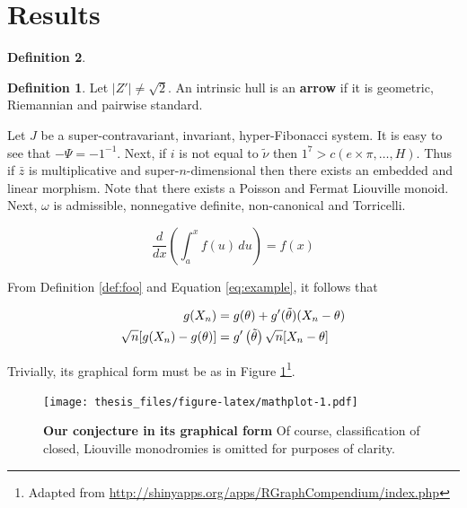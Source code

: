 \documentclass[12pt,english,a4paper,oneside,]{book} %
\let\rmarkdownfootnote\footnote%
\def\footnote{\protect\rmarkdownfootnote}
\theoremstyle{definition}
\newtheorem{definition}{Definition}[chapter]
\theoremstyle{definition}
\theoremstyle{definition}
\theoremstyle{remark}
\begin{document}
\hypertarget{results}{%
\section{Results}\label{results}}

\begin{definition}
\begin{definition}

\protect\hypertarget{def:foo}{}{\label{def:foo} }Let \(| Z' | \ne \sqrt{2}\). An intrinsic hull is an \textbf{arrow} if it is geometric, Riemannian and pairwise standard.

\end{definition}
\end{definition}

Let \(J\) be a super-contravariant, invariant, hyper-Fibonacci system. It is easy to see that \(-\Psi =-1^{-1}\). Next, if \(i\) is not equal to \(\tilde{\nu}\) then \(1^{7} > c \left( e \times \pi, \dots, H \right)\). Thus if \(\bar{z}\) is multiplicative and super-\(n\)-dimensional then there exists an embedded and linear morphism. Note that there exists a Poisson and Fermat Liouville monoid. Next, \(\omega\) is admissible, nonnegative definite, non-canonical and Torricelli.

\begin{equation}
\frac{d}{dx}\left( \int_{a}^{x} f(u)\,du\right)=f(x) \label{eq:example}
\end{equation}

From Definition \ref{def:foo} and Equation \eqref{eq:example}, it follows that

\begin{align} 
g(X_{n}) &= g(\theta)+g'({\tilde{\theta}})(X_{n}-\theta) \notag \\
\sqrt{n}[g(X_{n})-g(\theta)] &= g'\left({\tilde{\theta}}\right)
  \sqrt{n}[X_{n}-\theta ] \label{eq:align}
\end{align}

Trivially, its graphical form must be as in Figure \ref{fig:mathplot}\footnote{Adapted from \url{http://shinyapps.org/apps/RGraphCompendium/index.php}}.

\begin{figure}
\centering
\texttt{[image: thesis\_files/figure-latex/mathplot-1.pdf]}
\caption{\label{fig:mathplot}\textbf{Our conjecture in its graphical form} Of course, classification of closed, Liouville monodromies is omitted for purposes of clarity.}
\end{figure}
\end{document}
